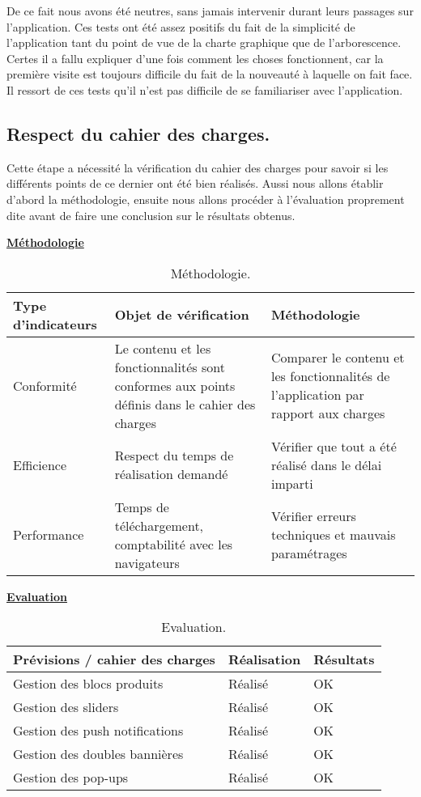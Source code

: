 De ce fait nous avons été neutres, sans jamais intervenir durant leurs passages sur l’application. Ces tests ont été assez positifs du fait de la simplicité de l’application tant du point de vue de la charte graphique que de l’arborescence. Certes il a fallu expliquer d’une fois comment les choses fonctionnent, car la première visite est toujours difficile du fait de la nouveauté à laquelle on  fait face. Il ressort de ces tests qu’il n’est pas difficile de se familiariser avec l’application.


\subsection{Respect du cahier des charges.}

Cette étape a nécessité la vérification du cahier des charges pour savoir si les différents points de ce dernier ont été bien réalisés. Aussi nous allons établir d’abord la méthodologie, ensuite nous allons procéder à l’évaluation proprement dite avant de faire une conclusion sur le résultats obtenus.

\textbf{\underline{Méthodologie}}

\begin{table}[H]
	\caption{Méthodologie.}
	\label{Méthodologie.}
	\centering
	\begin{tabularx}{\linewidth}{|X|X|X|}
		\hline \rowcolor{lightgray}  
		\textbf{Type d'indicateurs} & \textbf{Objet de vérification} & \textbf{Méthodologie}\\
		\hline
		Conformité & Le contenu et les fonctionnalités sont conformes aux points définis dans le cahier des charges  &Comparer le contenu et les fonctionnalités de l’application par rapport aux charges  \\
		\hline
		Efficience & Respect du temps de réalisation demandé
 &  Vérifier que tout a été réalisé dans le délai imparti \\
		\hline
		Performance & Temps de téléchargement, comptabilité avec les navigateurs  & Vérifier erreurs techniques et mauvais paramétrages\\
		\hline
	\end{tabularx}
\end{table}

\textbf{\underline{Evaluation}}

\begin{table}[H]
	\caption{Evaluation.}
	\label{Evaluation.}
	\centering
	\begin{tabularx}{\linewidth}{|X|X|X|}
		\hline \rowcolor{lightgray}  
		\textbf{Prévisions / cahier des charges} & \textbf{Réalisation} & \textbf{Résultats}\\
		\hline
		Gestion des blocs produits & Réalisé  & OK \\
		\hline
		Gestion des sliders & Réalisé & OK \\
		\hline
		Gestion des push notifications & Réalisé  & OK \\
		\hline
		Gestion des doubles bannières & Réalisé  & OK \\
		\hline
		Gestion des pop-ups & Réalisé  & OK \\
		\hline
	\end{tabularx}
\end{table}

